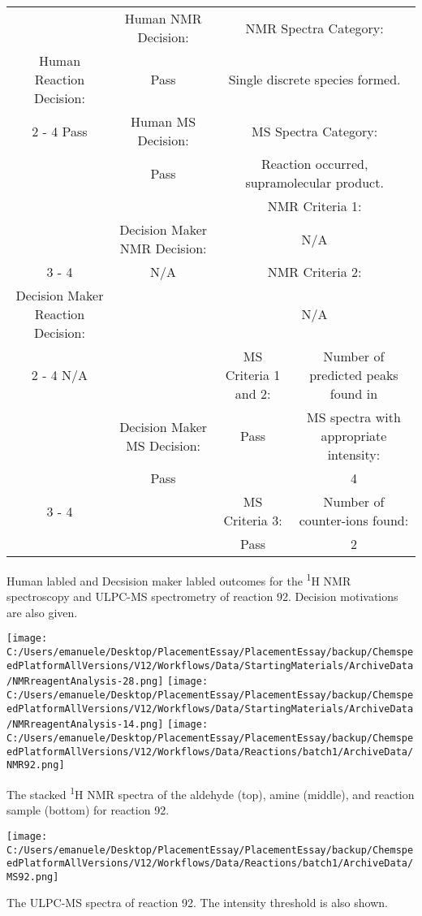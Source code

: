 \documentclass{article}%
\begin{document}
\begin{Decision Table}[H]%
\begin{tabular}{|c|c|c|c|}%
\hline%
&Human NMR Decision:&\multicolumn{2}{|c|}{NMR Spectra Category:}\\%
Human Reaction Decision:&Pass&\multicolumn{2}{|c|}{Single discrete species formed.}\\%
\cline{2%
-%
4}%
Pass&Human MS Decision:&\multicolumn{2}{|c|}{MS Spectra Category:}\\%
&Pass&\multicolumn{2}{|c|}{Reaction occurred, supramolecular product.}\\%
\hline%
&&\multicolumn{2}{|c|}{NMR Criteria 1:}\\%
&Decision Maker NMR Decision:&\multicolumn{2}{|c|}{N/A}\\%
\cline{3%
-%
4}%
&N/A&\multicolumn{2}{|c|}{NMR Criteria 2:}\\%
Decision Maker Reaction Decision:&&\multicolumn{2}{|c|}{N/A}\\%
\cline{2%
-%
4}%
N/A&&MS Criteria 1 and 2:&Number of predicted peaks found in\\%
&Decision Maker MS Decision:&Pass&MS spectra with appropriate intensity:\\%
&Pass&&4\\%
\cline{3%
-%
4}%
&&MS Criteria 3:&Number of counter{-}ions found:\\%
&&Pass&2\\%
\hline%
\end{tabular}%
\caption{Human labled and Decsision maker labled outcomes for the \textsuperscript{1}H NMR spectroscopy and ULPC-MS spectrometry of reaction 92. Decision motivations are also given.}%
\end{Decision Table}%
\begin{NMR Spectra}[H]%
\begin{center}%
\texttt{[image: C:/Users/emanuele/Desktop/PlacementEssay/PlacementEssay/backup/ChemspeedPlatformAllVersions/V12/Workflows/Data/StartingMaterials/ArchiveData/NMRreagentAnalysis-28.png]}\hfill%
\texttt{[image: C:/Users/emanuele/Desktop/PlacementEssay/PlacementEssay/backup/ChemspeedPlatformAllVersions/V12/Workflows/Data/StartingMaterials/ArchiveData/NMRreagentAnalysis-14.png]}\hfill%
\texttt{[image: C:/Users/emanuele/Desktop/PlacementEssay/PlacementEssay/backup/ChemspeedPlatformAllVersions/V12/Workflows/Data/Reactions/batch1/ArchiveData/NMR92.png]}\hfill%
\end{center}%
\caption{The stacked \textsuperscript{1}H NMR spectra of the aldehyde (top), amine (middle), and reaction sample (bottom) for reaction 92.}%
\end{NMR Spectra}%
\begin{MS Spectra}[H]%
\begin{center}%
\texttt{[image: C:/Users/emanuele/Desktop/PlacementEssay/PlacementEssay/backup/ChemspeedPlatformAllVersions/V12/Workflows/Data/Reactions/batch1/ArchiveData/MS92.png]}\hfill%
\end{center}%
\caption{The ULPC-MS spectra of reaction 92. The intensity threshold is also shown.}%
\end{MS Spectra}%
\end{document}
